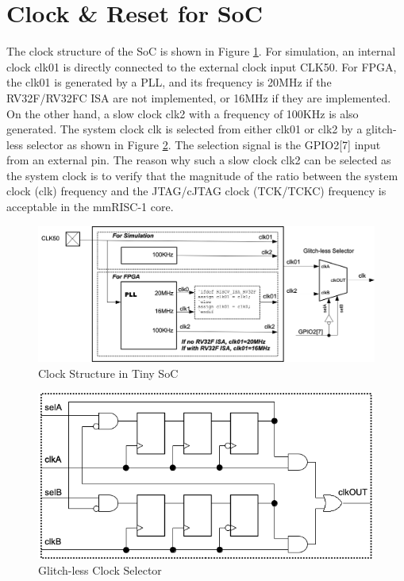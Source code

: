 \section{Clock \& Reset for SoC}
\label{sec:CLOCKRESETSOC}

The clock structure of the SoC is shown in Figure \ref{fig:CLOCKSOC}. For simulation, an internal clock clk01 is directly connected to the external clock input CLK50. For FPGA, the clk01 is generated by a PLL, and its frequency is 20MHz if the RV32F/RV32FC ISA are not implemented, or 16MHz if they are implemented. On the other hand, a slow clock clk2 with a frequency of 100KHz is also generated. The system clock clk is selected from either clk01 or clk2 by a glitch-less selector as shown in Figure \ref{fig:GLITCHLESSSELECTOR}. The selection signal is the GPIO2[7] input from an external pin. The reason why such a slow clock clk2 can be selected as the system clock is to verify that the magnitude of the ratio between the system clock (clk) frequency and the JTAG/cJTAG clock (TCK/TCKC) frequency is acceptable in the mmRISC-1 core.

\begin{figure}[H]
    \includegraphics[width=1.00\columnwidth]{./Figure/ClockSoC.png}
    \caption{Clock Structure in Tiny SoC}
    \label{fig:CLOCKSOC}
\end{figure}

\begin{figure}[H]
    \includegraphics[width=0.6\columnwidth]{./Figure/GlitchlessSelector.png}
    \caption{Glitch-less Clock Selector}
    \label{fig:GLITCHLESSSELECTOR}
\end{figure}

